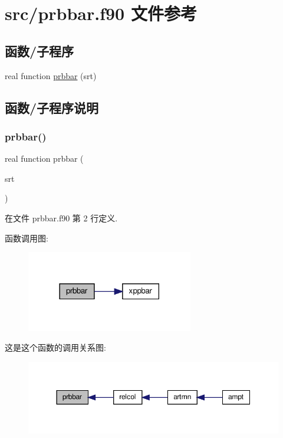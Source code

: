 \hypertarget{prbbar_8f90}{}\section{src/prbbar.f90 文件参考}
\label{prbbar_8f90}
\subsection*{函数/子程序}
\begin{DoxyCompactItemize}
\item 
real function \mbox{\hyperlink{prbbar_8f90_ad3752e7d5f7784ccae59160141963dea}{prbbar}} (srt)
\end{DoxyCompactItemize}


\subsection{函数/子程序说明}
\mbox{\label{prbbar_8f90_ad3752e7d5f7784ccae59160141963dea}} 
\subsubsection{\texorpdfstring{prbbar()}{prbbar()}}
{\footnotesize\ttfamily real function prbbar (\begin{DoxyParamCaption}\item[{}]{srt }\end{DoxyParamCaption})}



在文件 prbbar.\+f90 第 2 行定义.

函数调用图\+:
\nopagebreak
\begin{figure}[H]
\begin{center}
\leavevmode
\includegraphics[width=206pt]{prbbar_8f90_ad3752e7d5f7784ccae59160141963dea_cgraph}
\end{center}
\end{figure}
这是这个函数的调用关系图\+:
\nopagebreak
\begin{figure}[H]
\begin{center}
\leavevmode
\includegraphics[width=350pt]{prbbar_8f90_ad3752e7d5f7784ccae59160141963dea_icgraph}
\end{center}
\end{figure}
